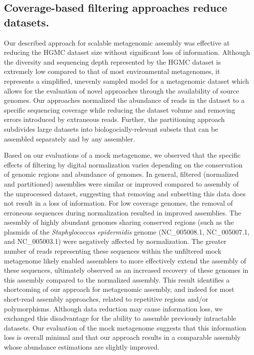 \documentclass{pnastwo}
\begin{document}
\begin{article}
\subsection*{Coverage-based filtering approaches reduce datasets.} 
Our described approach for scalable metagenomic assembly was effective at reducing the HGMC
dataset size without significant loss of information.  Although the
diversity and sequencing depth represented by the HGMC dataset is extremely low
compared to that of most environmental metagenomes, it represents a simplified,
unevenly sampled model for a metagenomic dataset which allows for the evaluation
of novel approaches through the availability of source genomes. Our approaches
normalized the abundance of reads in the dataset to a specific sequencing coverage
while reducing the dataset volume and removing errors introduced by extraneous reads. Further, the partitioning approach subdivides large datasets into biologocially-relevant subsets that can be assembled separately and by any assembler. 

Based on our evaluations of a mock metagenome, we observed that the specific effects of filtering by digital normalization varies depending on the conservation of genomic regions and abundance of genomes.  In general, filtered (normalized and partitioned) assemblies were similar or improved compared to assembly of the unprocessed dataset, suggesting that removing and subsetting this data does not result in a loss of information.  For low coverage genomes, the removal of erroneous sequences during normalization resulted in improved assemblies.  The asesmbly of highly abundant genomes sharing conserved regions (such as the plasmids of the \emph{Staphylococcus epidermidis} genome (NC\_005008.1,
NC\_005007.1, and NC\_005003.1) were negatively affected by normalization.  The greater number of reads representing these sequences within the unfiltered mock metagenome likely
enabled assemblers to more effectively extend the assembly of these
sequences, ultimately observed as an increased recovery of these genomes in
this assembly compared to the normalized assembly.  This result identifies a
shortcoming of our approach for metagenomic assembly, and indeed for most short-read assembly approaches,
related to repetitive regions and/or polymorphisms. Although data reduction may
cause information loss, we exchanged this disadvantage for the ability to
assemble previously intractable datasets. Our evaluation of the mock metagenome
suggests that this information loss is overall minimal and that our approach
results in a comparable assembly whose abundance estimations are slightly
improved.


\end{article}
\end{document}
